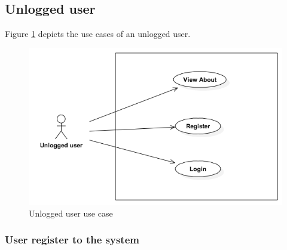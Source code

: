 \documentclass[10pt,a4paper,titlepage]{article}
\begin{document}
\subsection{Unlogged user}
Figure \ref{fig:Unlogged_usc} depicts the use cases of an unlogged user.
\begin{figure}[h]
\centering
\includegraphics[width=\linewidth]{./Use_case/unlogged_usecase.png}
\caption[Unlogged_usc]{Unlogged user use case}
\label{fig:Unlogged_usc}
\end{figure}

\clearpage
\subsubsection{User register to the system}
\end{document}
